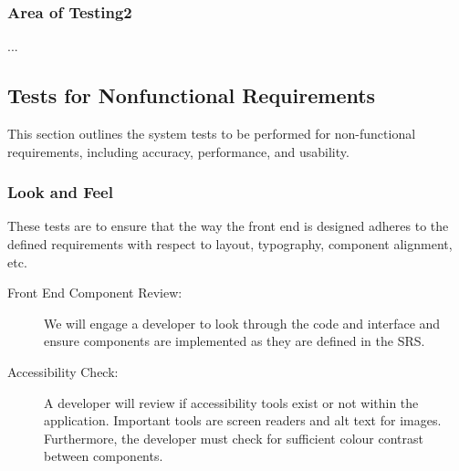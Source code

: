 \documentclass[12pt, titlepage]{article}
\begin{document}
\subsubsection{Area of Testing2}

...

\subsection{Tests for Nonfunctional Requirements}






This section outlines the system tests to be performed for non-functional requirements, including accuracy, performance, and usability.

\subsubsection{Look and Feel}
These tests are to ensure that the way the front end is designed adheres to the
defined requirements with respect to layout, typography, component alignment,
etc. 

\begin{description}
  \item[Front End Component Review:] We will engage a developer to look through
  the code and interface and ensure components are implemented as they are
  defined in the SRS.
  \item[Accessibility Check:] A developer will review if accessibility tools
  exist or not within the application. Important tools are screen readers and
  alt text for images. Furthermore, the developer must check for sufficient
  colour contrast between components.
\end{description}
\end{document}
